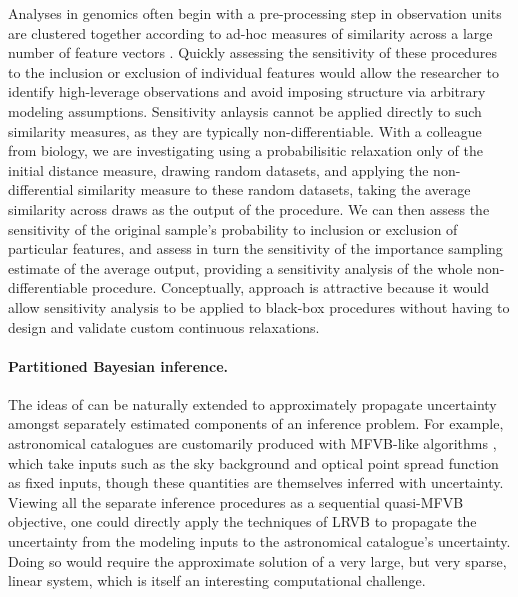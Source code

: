 Analyses in genomics often begin with a pre-processing step in observation units
are clustered together according to ad-hoc measures of similarity across a large
number of feature vectors \citep{xu:2015:identification,
stuart:2019:comprehensive}.  Quickly assessing the sensitivity of these
procedures to the inclusion or exclusion of individual features would allow the
researcher to identify high-leverage observations and avoid imposing structure
via arbitrary modeling assumptions.   Sensitivity anlaysis cannot be applied
directly to such similarity measures, as they are typically non-differentiable.
With a colleague from biology, we are investigating using a probabilisitic
relaxation only of the initial distance measure, drawing random datasets, and
applying the non-differential similarity measure to these random datasets,
taking the average similarity across draws as the output of the procedure. We
can then assess the sensitivity of the original sample's probability to
inclusion or exclusion of particular features, and assess in turn the
sensitivity of the importance sampling estimate of the average output, providing
a sensitivity analysis of the whole non-differentiable procedure.  Conceptually,
approach is attractive because it would allow sensitivity analysis to be applied
to black-box procedures without having to design and validate custom continuous
relaxations.


\paragraph{Partitioned Bayesian inference.}

The ideas of \citep{giordano:2018:covariances} can be naturally extended to
approximately propagate uncertainty amongst separately estimated components of
an inference problem.  For example, astronomical catalogues are customarily
produced with MFVB-like algorithms \citep{lang:2016:tractor,
regier:2019:cataloging}, which take inputs such as the sky background
and optical point spread function as fixed inputs, though these quantities
are themselves inferred with uncertainty.  Viewing all the separate inference
procedures as a sequential quasi-MFVB objective, one could directly apply
the techniques of LRVB to propagate the uncertainty from the modeling inputs
to the astronomical catalogue's uncertainty.  Doing so would require the
approximate solution of a very large, but very sparse, linear system,
which is itself an interesting computational challenge.











